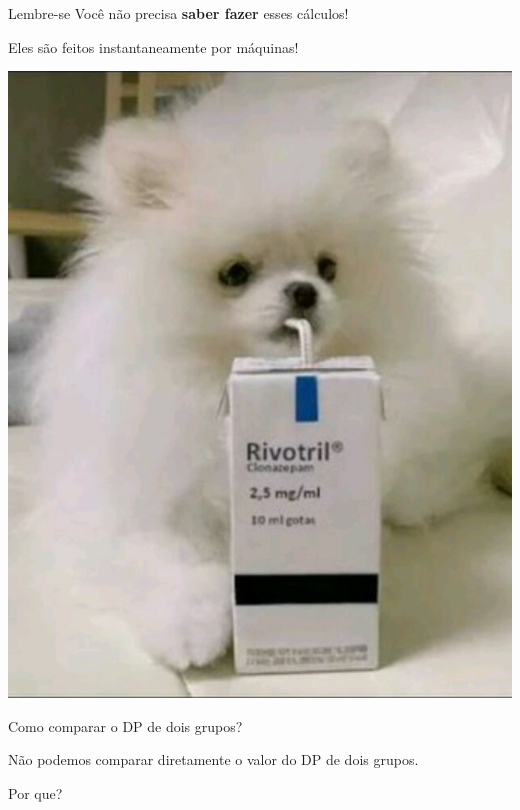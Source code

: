 \documentclass{beamer}
\begin{document}
\begin{frame}{\scriptsize}
  \begin{block}{Lembre-se}
    \footnotesize
    Você não precisa {\bf saber fazer} esses cálculos!

    \bigskip
    Eles são feitos instantaneamente por máquinas!
  \end{block}
  \bigskip
  \vfill
  \begin{center}
    \includegraphics[height=.5\textheight]{Cap3/meme-rivis}
  \end{center}
\end{frame}


\begin{frame}{\scriptsize Como comparar o DP de dois grupos?}
  \begin{block}{}
    \footnotesize
    Não podemos comparar diretamente o \alert{valor} do DP de dois grupos.

    \bigskip
    Por que?
  \end{block}
\end{frame}
\end{document}
